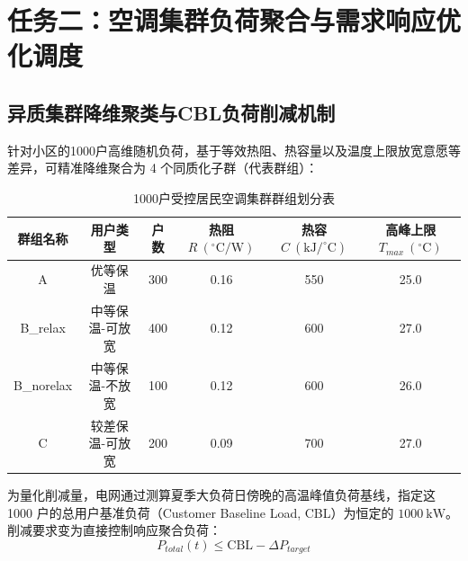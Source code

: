 \documentclass[12pt,a4paper]{article}
\begin{document}
\section{任务二：空调集群负荷聚合与需求响应优化调度}
\subsection{异质集群降维聚类与CBL负荷削减机制}
针对小区的1000户高维随机负荷，基于等效热阻、热容量以及温度上限放宽意愿等差异，可精准降维聚合为 4 个同质化子群（代表群组）：

\begin{table}[H]
    \centering
    \caption{1000户受控居民空调集群群组划分表}
    \begin{tabular}{cccccc}
        \toprule
        \textbf{群组名称} & \textbf{用户类型} & \textbf{户数} & \textbf{热阻 $R\ (^\circ\text{C/W})$} & \textbf{热容 $C\ (\text{kJ/}^\circ\text{C})$} & \textbf{高峰上限 $T_{max}\ (^\circ\text{C})$} \\ \midrule
        A & 优等保温 & 300 & 0.16 & 550 & 25.0 \\
        B\_relax & 中等保温-可放宽 & 400 & 0.12 & 600 & 27.0 \\
        B\_norelax & 中等保温-不放宽 & 100 & 0.12 & 600 & 26.0 \\
        C & 较差保温-可放宽 & 200 & 0.09 & 700 & 27.0 \\
        \bottomrule
    \end{tabular}
    \label{tab:cohorts}
\end{table}

为量化削减量，电网通过测算夏季大负荷日傍晚的高温峰值负荷基线，指定这 1000 户的总用户基准负荷（Customer Baseline Load, CBL）为恒定的 $1000\ \text{kW}$。削减要求变为直接控制响应聚合负荷：
\begin{equation}
    P_{total}(t) \le \text{CBL} - \Delta P_{target}
\end{equation}
\end{document}
